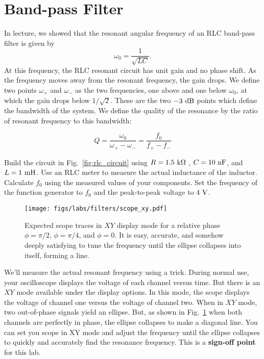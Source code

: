 \section{Band-pass Filter}

In lecture, we showed that the resonant angular frequency of an RLC
band-pass filter is given by
\begin{equation}
\omega_0 = \frac{1}{\sqrt{LC}}. 
\end{equation}
At this frequency, the RLC resonant circuit has unit gain and no phase
shift.  As the frequency moves away from the resonant frequency, the
gain drops.  We define two points $\omega_+$ and $\omega_-$ as the two
frequencies, one above and one below $\omega_0$, at which the gain
drops below $1/\sqrt{2}$.  These are the two $-3~\rm dB$ points which
define the bandwidth of the system.  We define the quality of the
resonance by the ratio of resonant frequency to this bandwidth:

\begin{displaymath}
Q = \frac{\omega_0}{\omega_+ - \omega_-} = \frac{f_0}{f_+-f_-}
\end{displaymath}


Build the circuit in Fig.~\ref{fig:rlc_circuit} using $R=1.5~{\rm k \Omega}$ ,
$C=10~\rm{n F}$, and $L=1~\rm mH$.  Use an RLC meter to measure the actual inductance of the inductor.
Calculate $f_0$ using the measured values of your components.  Set the frequency of the
function generator to $f_0$ and the peak-to-peak
voltage to $4~\rm V$.

\begin{figure}[htbp]
\begin{center}
\texttt{[image: figs/labs/filters/scope\_xy.pdf]}
\end{center}
\caption{\label{fig:scopexy} 
Expected scope traces in $XY$ display mode for a relative phase $\phi=\pi/2$, 
$\phi=\pi/4$, and $\phi=0$.  It is easy, accurate, and somehow deeply satisfying to tune the frequency until the ellipse collapses into itself, forming a line.}
\end{figure}

We'll measure the actual resonant frequency using a trick.  During normal
use, your oscilloscope displays the voltage of each channel versus
time.  But there is an $XY$ mode available under the display options.
In this mode, the scope displays the voltage of channel one versus the
voltage of channel two.  When in $XY$ mode, two out-of-phase signals
yield an ellipse.  But, as shown in Fig.~\ref{fig:scopexy} when both
channels are perfectly in phase, the ellipse collapses to make a
diagonal line.  You can set you scope in XY mode and adjust the
frequency until the ellipse collapses to quickly and accurately find
the resonance frequency.  This is a {\bf sign-off point} for this lab.

